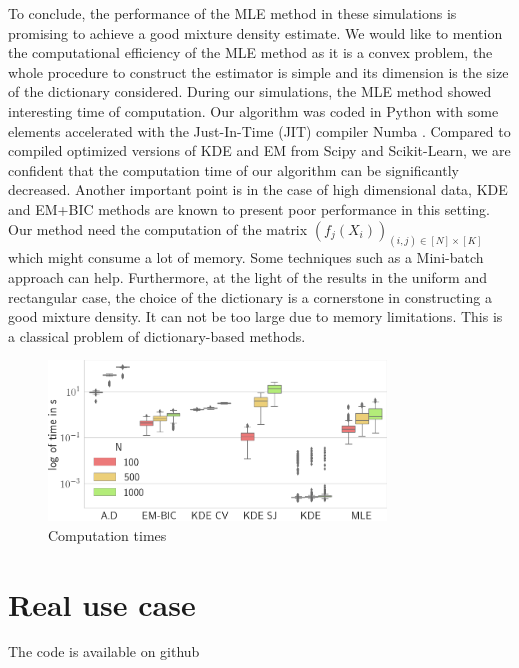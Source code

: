 To conclude, the performance of the MLE method in these simulations is promising to achieve a good mixture density estimate. We would like to mention the computational efficiency of the MLE method as it is a convex problem, the whole procedure to construct the estimator is simple and its dimension is the size of the dictionary considered. During our simulations, the MLE method showed interesting time of computation. Our algorithm was coded in Python with some elements accelerated with the Just-In-Time (JIT) compiler Numba \citep{numba}. Compared to compiled optimized versions of KDE and EM from Scipy and Scikit-Learn\citep{scikit-learn}, we are confident that the computation time of our algorithm can be significantly decreased. Another important point is in the case of high dimensional data, KDE and EM+BIC methods are known to present poor performance in this setting. Our method need the computation of the matrix $(f_j(X_i))_{(i,j)\in [N]\times [K]}$ which might consume a lot of memory. Some techniques such as a Mini-batch approach can help. Furthermore, at the light of the results in the uniform and rectangular case, the choice of the dictionary is a cornerstone in constructing a good mixture density. It can not be too large due to memory limitations. This is a classical problem of dictionary-based methods.

\begin{figure}
\center
    \includegraphics[width=0.8\textwidth]{./TeX_files/res_times.png}
    \caption{Computation times}
    \label{fig:res_times}
\end{figure}

\section{Real use case}

The code is available on github